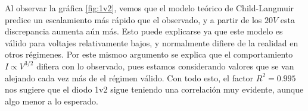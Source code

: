 Al observar la gráfica \ref{fig:1v2}, vemos que el modelo teórico de Child-Langmuir predice un escalamiento más rápido que el observado, y a partir de los $20V$ esta discrepancia aumenta aún más. Esto puede explicarse ya que este modelo es válido para voltajes relativamente bajos, y normalmente difiere de la realidad en otros régimenes.
\newpage
Por este mismoo argumento se explica que el comportamiento $I\propto V^{3/2}$ difiera con lo observado, pues estamos considerando valores que se van alejando cada vez más de el régimen válido. Con todo esto, el factor $R^2 = 0.995$ nos sugiere que el diodo 1v2 sigue teniendo una correlación muy evidente, aunque algo menor a lo esperado.
\noindent
